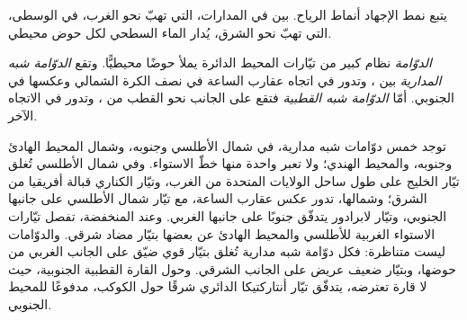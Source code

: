 يتبع نمط الإجهاد أنماط الرياح. بين  في المدارات، التي تهبّ نحو الغرب،  في  الوسطى، التي تهبّ نحو الشرق، يُدار الماء السطحي لكل حوض محيطي.

\begin{definition}\label{def:b1:ocean-circulation:gyre}
\emph{الدوّامة} نظام كبير من تيّارات المحيط الدائرة يملأ حوضًا محيطيًّا. وتقع \emph{الدوّامة شبه المدارية} بين  ، وتدور في اتجاه عقارب الساعة في نصف الكرة الشمالي وعكسها في الجنوبي. أمّا \emph{الدوّامة شبه القطبية} فتقع على الجانب نحو القطب من ، وتدور في الاتجاه الآخر.
\end{definition}

توجد خمس دوّامات شبه مدارية، في شمال الأطلسي وجنوبه، وشمال المحيط الهادئ وجنوبه، والمحيط الهندي؛ ولا تعبر واحدة منها خطّ الاستواء. وفي شمال الأطلسي تُغلق  تيّار الخليج على طول ساحل الولايات المتحدة من الغرب، وتيّار الكناري قبالة أفريقيا من الشرق؛ وشمالها، تدور  عكس عقارب الساعة، مع تيّار شمال الأطلسي على جانبها الجنوبي، وتيّار لابرادور يتدفّق جنوبًا على جانبها الغربي. وعند  المنخفضة، تفصل تيّارات الاستواء الغربية للأطلسي والمحيط الهادئ عن بعضها بتيّار مضاد شرقي. والدوّامات ليست متناظرة: فكل دوّامة شبه مدارية تُغلق بتيّار قوي ضيّق على الجانب الغربي من حوضها، وبتيّار ضعيف عريض على الجانب الشرقي. وحول القارة القطبية الجنوبية، حيث لا قارة تعترضه، يتدفّق تيّار أنتاركتيكا الدائري شرقًا حول الكوكب، مدفوعًا  للمحيط الجنوبي.

